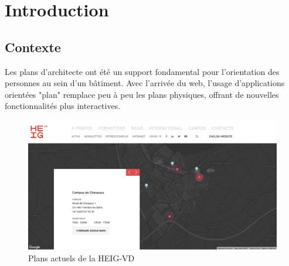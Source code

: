 \documentclass[
    iai, %
    il, %
]{heig-tb}
\begin{document}
\maketitle
\frontmatter
\clearemptydoublepage

\preamble
\authentification

\begin{abstract}
    
\end{abstract}

\clearemptydoublepage
{
    \tableofcontents
    \let\cleardoublepage\clearpage
    \listoffigures
    \let\cleardoublepage\clearpage
    \listoftables
}

\printnomenclature
\clearemptydoublepage
{}

\mainmatter
\chapter{Introduction}
\section{Contexte}
Les plans d'architecte ont été un support fondamental pour l'orientation des personnes au sein d'un bâtiment.
Avec l'arrivée du web, l'usage d'applications orientées "plan" remplace peu à peu les plans physiques, offrant de nouvelles fonctionnalités plus interactives.

\begin{figure}[h]
    \centering
    \includegraphics{actual_heig_plan.png}
    \caption{Plans actuels de la HEIG-VD}
    \label{fig:heigCurrentMap}
\end{figure}
\end{document}
